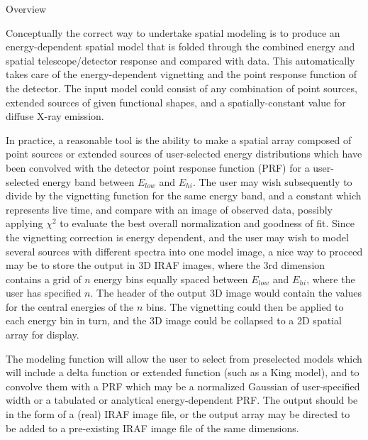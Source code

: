 %
\def\version{Version 1.0 --- 11/22/88}
\def\chapter{Spatial --- Modeling}
\@{Overview}

Conceptually the correct way to undertake spatial modeling is
to produce an energy-dependent spatial model that is folded through
the combined energy and spatial telescope/detector response and compared with data.  This
automatically takes care of the energy-dependent vignetting and
the point response function of the detector.  The input model
could consist of any combination of point sources, extended sources of
given functional shapes, and a spatially-constant value for diffuse
X-ray emission.

In practice, a reasonable tool is the ability to make a spatial array
composed of point sources or extended sources of user-selected energy
distributions which have been convolved with the detector point
response function (PRF) for a user-selected
energy band between $E_{low}$ and $E_{hi}$.  The user
may wish subsequently to divide by the vignetting
function for the same energy band, and a constant which represents
live time, and compare with an image of observed data, possibly
applying
$\chi^2$ to evaluate the best overall normalization and goodness of
fit. Since the vignetting correction is energy
dependent, and the user may wish to model several sources with
different spectra into one model image, a nice way to proceed may be
to store the output in 3D IRAF images, where the 3rd dimension
contains a grid of $n$ energy bins equally spaced between $E_{low}$
and $E_{hi}$, where the user has specified $n$.  The header of the
output 3D image would contain the values for the central energies of
the $n$ bins.
The vignetting could then be applied to each energy bin in turn, and
the 3D image could be collapsed to a 2D spatial array for display.

The modeling function will allow the user to select from preselected
models which will include a delta function or extended function (such
as a King model), and to convolve them with a PRF which may be a
normalized Gaussian of user-specified width or
a tabulated or analytical energy-dependent PRF.  The output should
be in the form of a (real) IRAF image file, or the output array
may be directed to be added to a
pre-existing IRAF image file of the same dimensions.

